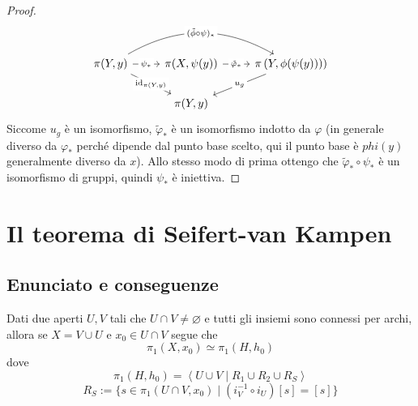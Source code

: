 \begin{proof}
\begin{equation*}
	\begin{tikzcd}
	{\pi(Y,y)} \arrow[rd, "{\operatorname{id}_{\pi(Y,y)}}" description] \arrow[r, "\psi_*" description] \arrow[rr, "(\tilde{\phi}\circ\psi)_*" description, bend left] & {\pi(X,\psi(y))} \arrow[r, "\tilde{\varphi}_*" description] & {\pi\left(Y,\phi(\psi(y))\right))} \arrow[ld, "u_g" description] \\
	& {\pi(Y,y)}                                                  &                                                                 
	\end{tikzcd}
	\end{equation*}
	Siccome $u_g$ è un isomorfismo, $\tilde{\varphi}_*$ è un isomorfismo indotto da $\varphi$ (in generale diverso da $\varphi_*$ perché dipende dal punto base scelto, qui il punto base è $phi(y)$ generalmente diverso da $x$). Allo stesso modo di prima ottengo che $\tilde{\varphi}_*\circ\psi_* $ è un isomorfismo di gruppi, quindi $\psi_*$ è iniettiva.
\end{proof}





\section{Il teorema di Seifert-van Kampen}
\subsection{\textcolor{TopAlg}{\textbf{Enunciato e conseguenze}}}


\begin{theorem}
	Dati due aperti $U, V$ tali che $U \cap V \neq \varnothing$ e tutti gli insiemi sono connessi per archi, allora se $X = V \cup U$ e $x_0 \in U\cap V$ segue che 
	\begin{equation*}
		\pi_1(X, x_0) \simeq \pi_1(H, h_0)
	\end{equation*} 
	dove 
	\begin{equation*}
	\pi_1(H,h_0) = \left\langle U \cup V \mid R_1 \cup R_2 \cup R_S \right\rangle
	\end{equation*}
	\begin{equation*}
	R_S := \{s \in \pi_1(U \cap V,x_0) \mid (i^{-1}_V \circ i_{U}) \left[s\right] = \left[s\right]\}
	\end{equation*}
\end{theorem}

